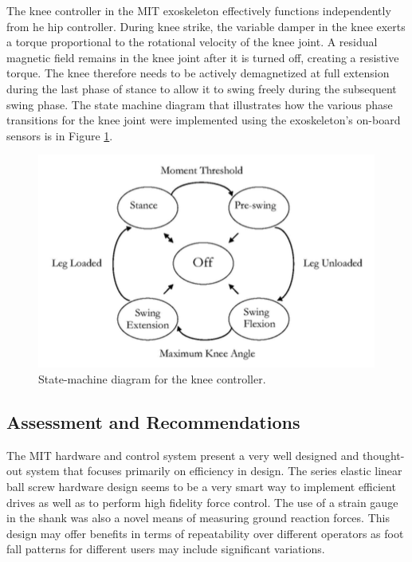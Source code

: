 \begin{refsection}
 The knee controller in the MIT exoskeleton effectively functions independently from he hip controller.  During knee strike, the variable damper in the knee exerts a torque proportional to the rotational velocity of the knee joint.  A residual magnetic field remains in the knee joint after it is turned off, creating a resistive torque.  The knee therefore needs to be actively demagnetized at full extension during the last phase of stance to allow it to swing freely during the subsequent swing phase.  The state machine diagram that illustrates how the various phase transitions for the knee joint were implemented using the exoskeleton's on-board sensors is in Figure \ref{fig:kneeControl}.
  \begin{figure}[thpb]
\centering
\includegraphics[width=3.in]{exos/figs/MIT/kneeControl}
  \caption{State-machine diagram for the knee controller.}
 \label{fig:kneeControl} 
 \end{figure}  
  
  
% 
 
 
 \subsection{Assessment and Recommendations}
 
 The MIT hardware and control system present a very well designed and thought-out system that focuses primarily on efficiency in design.  The series elastic linear ball screw hardware design seems to be a very smart way to implement efficient drives as well as to perform high fidelity force control.  The use of a strain gauge in the shank was also a novel means of measuring ground reaction forces.  This design may offer benefits in terms of repeatability over different operators as foot fall patterns for different users may include significant variations.
 

\end{refsection}
